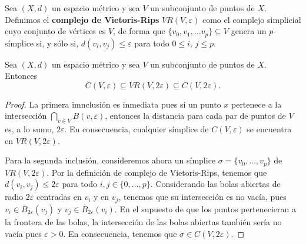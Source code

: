 \begin{definicion}
	Sea $(X,d)$ un espacio métrico y sea $V$ un subconjunto de puntos de $X$. Definimos el \textbf{complejo de Vietoris-Rips} $VR(V,\varepsilon)$ como el complejo simplicial cuyo conjunto de vértices es $V$, de forma que $\{v_0, v_1, \dots v_p\} \subseteq V$ genera un $p$-símplice si, y sólo si, $d(v_i,v_j) \leq \varepsilon$ para todo $0 \leq i$, $j \leq p$.
\end{definicion}
\begin{proposicion}
	Sea $(X,d)$ un espacio métrico y sea $V$ un subconjunto de puntos de $X$. Entonces
	\[
		C(V, \varepsilon) \subseteq VR(V, 2\varepsilon) \subseteq C(V, 2\varepsilon).
	\]
\end{proposicion}
\begin{proof}
	La primera imnclusión es inmediata pues si un punto $x$ pertenece a la intersección $\bigcap_{v \in V} B(v, \varepsilon)$, entonces la distancia para cada par de puntos de $V$ es, a lo sumo, $2 \varepsilon$. En consecuencia, cualquier símplice de $C(V,\varepsilon)$ se encuentra en $VR(V, 2\varepsilon)$.
	
	Para la segunda inclusión, consideremos ahora un símplice $\sigma = \{v_0, \dots, v_p\}$ de $VR(V, 2\varepsilon)$. Por la definición de complejo de Vietoris-Rips, tenemos que $d(v_i, v_j) \leq 2\varepsilon$ para todo $i,j \in \{0, \dots, p\}$. Considerando las bolas abiertas de radio $2\varepsilon$ centradas en $v_i$ y en $v_j$, tenemos que su intersección es no vacía, pues $v_i \in \overline{B}_{2\varepsilon}(v_j)$ y $v_j \in \overline{B}_{2\varepsilon}(v_i)$. En el supuesto de que los puntos pertenecieran a la frontera de las bolas, la intersección de las bolas abiertas también sería no vacía pues $\varepsilon > 0$. En consecuencia, tenemos que $\sigma \in C(V,2\varepsilon)$.
\end{proof}

